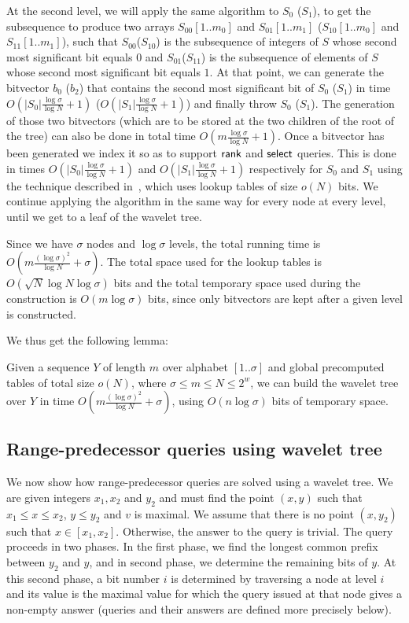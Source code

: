 \documentclass[11pt,runningheads]{llncs}
\def\rank{\mbox{\rm {\sf rank}}}
\def\select{\mbox{\rm {\sf select}}}
\begin{document}
At the second level, we will apply the same algorithm to $S_0$
($S_1$), to get the subsequence to produce two arrays $S_{00}[1..m_0]$ and $S_{01}[1..m_1]$
($S_{10}[1..m_0]$ and $S_{11}[1..m_1]$), 
such that $S_{00}$($S_{10}$) is the subsequence of integers of $S$ whose 
second most significant bit equals $0$ and $S_{01}$($S_{11}$) is the subsequence of elements of $S$ whose 
second most significant bit equals $1$. At that point, we can generate the bitvector $b_0$ ($b_2$) 
that contains the second 
most significant bit of $S_0$ ($S_1$) in time $O(|S_0|\frac{\log\sigma}{\log N}+1)$ ($O(|S_1|\frac{\log\sigma}{\log N}+1)$) and finally throw $S_0$ ($S_1$). The generation of those two bitvectors (which are to be stored at the two children of the root of the tree) can also be done in total time $O(m\frac{\log\sigma}{\log N}+1)$. Once a bitvector has been generated 
we index it so as to support $\rank$ and $\select$ queries. This is done in times $O(|S_0|\frac{\log\sigma}{\log N}+1)$ and $O(|S_1|\frac{\log\sigma}{\log N}+1)$ respectively for $S_0$ and $S_1$ using the technique described in~\cite{BGKS15}, which uses lookup tables of size $o(N)$ bits. 
We continue applying the algorithm in the same way for every node at every level, until we get to a leaf of the wavelet tree. 

Since we have $\sigma$ nodes and $\log\sigma$ levels, the total running time is 
$O(m\frac{(\log\sigma)^2}{\log N}+\sigma)$. The total space used for the lookup tables is 
$O(\sqrt{N}\log N\log\sigma)$ bits and the total temporary space used during the construction 
is $O(m\log\sigma)$ bits, since only bitvectors are kept after a given level is constructed. 

We thus get the following lemma: 

\begin{lemma}
\label{lemma:wavelet_tree_build}
Given a sequence $Y$ of length $m$ over alphabet $[1..\sigma]$ 
and global precomputed tables of total size $o(N)$, where $\sigma\leq m\leq N\leq 2^w$, we can build the wavelet tree
over $Y$ in time $O(m\frac{(\log\sigma)^2}{\log N}+\sigma)$, 
using $O(n\log\sigma)$ bits of temporary space. 
\end{lemma}

\subsection{Range-predecessor queries using wavelet tree} 

We now show how range-predecessor queries are solved using a wavelet tree. 
We are given integers $x_1,x_2$ and $y_2$ and must find the point $(x,y)$
such that $x_1\leq x\leq x_2$, $y\leq y_2$ and $v$ is maximal. 
We assume that there is no point $(x,y_2)$ such that $x\in[x_1,x_2]$. 
Otherwise, the answer to the query is trivial. 
The query proceeds in two phases. In the first phase, we find the longest 
common prefix between $y_2$ and $y$, and in second phase, we determine the 
remaining bits of $y$. At this second phase, a bit number $i$ is determined 
by traversing a node at level $i$ and its value is the maximal value
for which the query issued at that node gives a non-empty answer 
(queries and their answers are defined more precisely below). 
\end{document}
